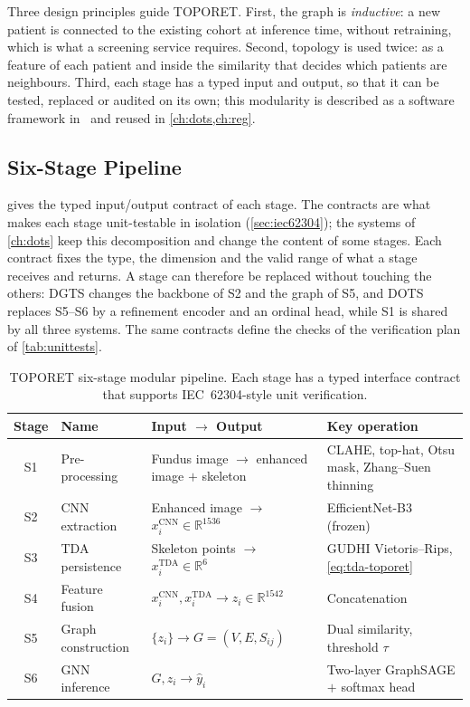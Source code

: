 Three design principles guide TOPORET. First, the graph is \emph{inductive}: a new patient
is connected to the existing cohort at inference time, without retraining, which is what a
screening service requires. Second, topology is used twice: as a feature of each patient
and inside the similarity that decides which patients are neighbours. Third, each stage
has a typed input and output, so that it can be tested, replaced or audited on its own;
this modularity is described as a software framework in~\cite{belhadj2026enase} and
reused in \cref{ch:dots,ch:reg}.



\subsection{Six-Stage Pipeline}
\label{sec:stages}

 gives the typed input/output contract of each stage. The contracts are
what makes each stage unit-testable in isolation (\cref{sec:iec62304}); the systems of
\cref{ch:dots} keep this decomposition and change the content of some stages.
Each contract fixes the type, the dimension and the valid range of what a stage receives
and returns. A stage can therefore be replaced without touching the others: DGTS changes
the backbone of S2 and the graph of S5, and DOTS replaces S5--S6 by a refinement encoder
and an ordinal head, while S1 is shared by all three systems. The same contracts define the
checks of the verification plan of \cref{tab:unittests}.

\begin{table}[H]
\centering
\caption[TOPORET six-stage modular pipeline]{TOPORET six-stage modular pipeline. Each stage has a typed interface contract
that supports IEC~62304-style unit verification.}
\label{tab:stages}
\small
\begin{tabular}{@{}c l P{4.6cm} P{4.4cm}@{}}
\toprule
Stage & Name & Input $\to$ Output & Key operation \\
\midrule
S1 & Pre-processing & Fundus image $\to$ enhanced image $+$ skeleton & CLAHE, top-hat, Otsu mask, Zhang--Suen thinning \\
S2 & CNN extraction & Enhanced image $\to$ $x_i^{\mathrm{CNN}}\in\mathbb{R}^{1536}$ & EfficientNet-B3 (frozen) \\
S3 & TDA persistence & Skeleton points $\to$ $x_i^{\mathrm{TDA}}\in\mathbb{R}^{6}$ & GUDHI Vietoris--Rips, \cref{eq:tda-toporet} \\
S4 & Feature fusion & $x_i^{\mathrm{CNN}}, x_i^{\mathrm{TDA}} \to z_i\in\mathbb{R}^{1542}$ & Concatenation \\
S5 & Graph construction & $\{z_i\}\to G=(V,E,S_{ij})$ & Dual similarity, threshold $\tau$ \\
S6 & GNN inference & $G, z_i \to \hat y_i$ & Two-layer GraphSAGE $+$ softmax head \\
\bottomrule
\end{tabular}
\end{table}

